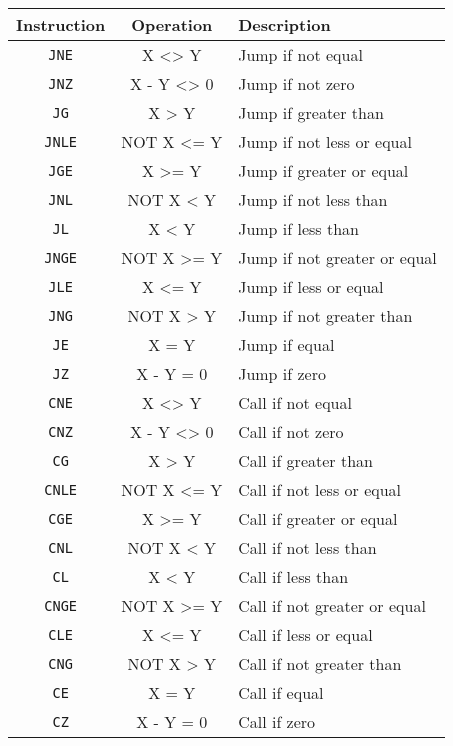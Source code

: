 \singlespacing
\begin{longtable}{|c|c|p{3.0in}|} \hline
Instruction & Operation & Description \\ \hline
\texttt{JNE}   & X <> Y     & Jump if not equal \\ \hline
\texttt{JNZ}   & X - Y <> 0 & Jump if not zero \\ \hline
\texttt{JG}    & X > Y      & Jump if greater than \\ \hline
\texttt{JNLE}  & NOT X <= Y & Jump if not less or equal \\ \hline
\texttt{JGE}   & X >= Y     & Jump if greater or equal \\ \hline
\texttt{JNL}   & NOT X < Y  & Jump if not less than\\ \hline
\texttt{JL}    & X < Y      & Jump if less than \\ \hline
\texttt{JNGE}  & NOT X >= Y & Jump if not greater or equal \\ \hline
\texttt{JLE}   & X <= Y     & Jump if less or equal\\ \hline
\texttt{JNG}   & NOT X > Y  & Jump if not greater than \\ \hline
\texttt{JE}    & X = Y      & Jump if equal \\ \hline
\texttt{JZ}    & X - Y = 0  & Jump if zero \\ \hline

\texttt{CNE}   & X <> Y     & Call if not equal \\ \hline
\texttt{CNZ}   & X - Y <> 0 & Call if not zero \\ \hline
\texttt{CG}    & X > Y      & Call if greater than \\ \hline
\texttt{CNLE}  & NOT X <= Y & Call if not less or equal \\ \hline
\texttt{CGE}   & X >= Y     & Call if greater or equal \\ \hline
\texttt{CNL}   & NOT X < Y  & Call if not less than\\ \hline
\texttt{CL}    & X < Y      & Call if less than \\ \hline
\texttt{CNGE}  & NOT X >= Y & Call if not greater or equal \\ \hline
\texttt{CLE}   & X <= Y     & Call if less or equal\\ \hline
\texttt{CNG}   & NOT X > Y  & Call if not greater than \\ \hline
\texttt{CE}    & X = Y      & Call if equal \\ \hline
\texttt{CZ}    & X - Y = 0  & Call if zero \\ \hline


\end{longtable}
